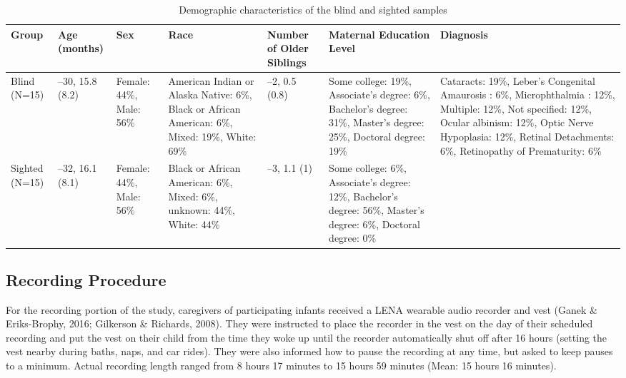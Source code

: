 \documentclass[
  man]{apa6}
\begin{document}
\begin{table}

\caption{\label{tab:participant-characteristics}Demographic characteristics of the blind and sighted samples}
\centering
\fontsize{8}{10}\selectfont
\begin{tabular}[t]{>{\raggedright\arraybackslash}p{.4in}|>{\raggedright\arraybackslash}p{.5in}|>{\raggedright\arraybackslash}p{.7in}|>{\raggedright\arraybackslash}p{.75in}|>{\raggedright\arraybackslash}p{.75in}|>{\raggedright\arraybackslash}p{1in}|>{\raggedright\arraybackslash}p{1.5in}}
\hline
Group & Age (months) & Sex & Race & Number of Older Siblings & Maternal Education Level & Diagnosis\\
\hline
Blind (N=15) & 6--30,
15.8 (8.2) & Female: 44\%,
Male: 56\% & American Indian or Alaska Native: 6\%,
Black or African American: 6\%,
Mixed: 19\%,
White: 69\% & 0--2,
0.5 (0.8) & Some college: 19\%,
Associate's degree: 6\%,
Bachelor's degree: 31\%,
Master's degree: 25\%,
Doctoral degree: 19\% & Cataracts: 19\%,
Leber's Congenital Amaurosis : 6\%,
Microphthalmia : 12\%,
Multiple: 12\%,
Not specified: 12\%,
Ocular albinism: 12\%,
Optic Nerve Hypoplasia: 12\%,
Retinal Detachments: 6\%,
Retinopathy of Prematurity: 6\%\\
\hline
Sighted (N=15) & 6--32,
16.1 (8.1) & Female: 44\%,
Male: 56\% & Black or African American: 6\%,
Mixed: 6\%,
unknown: 44\%,
White: 44\% & 0--3,
1.1 (1) & Some college: 6\%,
Associate's degree: 12\%,
Bachelor's degree: 56\%,
Master's degree: 6\%,
Doctoral degree: 0\% & \\
\hline
\end{tabular}
\end{table}

\hypertarget{recording-procedure}{%
\subsection{Recording Procedure}\label{recording-procedure}}

For the recording portion of the study, caregivers of participating infants received a LENA wearable audio recorder and vest (Ganek \& Eriks-Brophy, 2016; Gilkerson \& Richards, 2008). They were instructed to place the recorder in the vest on the day of their scheduled recording and put the vest on their child from the time they woke up until the recorder automatically shut off after 16 hours (setting the vest nearby during baths, naps, and car rides). They were also informed how to pause the recording at any time, but asked to keep pauses to a minimum. Actual recording length ranged from 8 hours 17 minutes to 15 hours 59 minutes (Mean: 15 hours 16 minutes).
\end{document}
